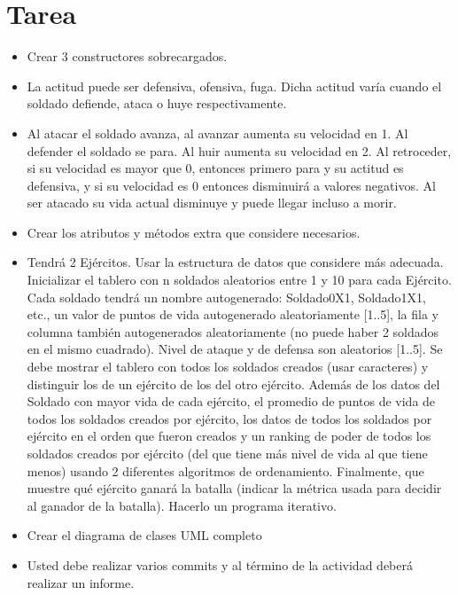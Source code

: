 \documentclass{article}
\begin{document}
	\section{Tarea}
	\begin{itemize}
		\item	 Crear 3 constructores sobrecargados.
		\item La actitud puede ser defensiva, ofensiva, fuga. Dicha actitud varía cuando el 
		soldado defiende, ataca o huye respectivamente.
		\item	Al atacar el soldado avanza, al avanzar aumenta su velocidad en 1. Al defender 
		el soldado se para. Al huir aumenta su velocidad en 2. Al retroceder, si su 
		velocidad es mayor que 0, entonces primero para y su actitud es defensiva, y 
		si su velocidad es 0 entonces disminuirá a valores negativos. Al ser atacado su 
		vida actual disminuye y puede llegar incluso a morir.
		\item Crear los atributos y métodos extra que considere necesarios.
		\item Tendrá 2 Ejércitos. Usar la estructura de datos que considere más adecuada. 
		Inicializar el tablero con n soldados aleatorios entre 1 y 10 para cada Ejército. 
		Cada soldado tendrá un nombre autogenerado: Soldado0X1, Soldado1X1, etc.,
		un valor de puntos de vida autogenerado aleatoriamente [1..5], la fila y 
		columna también autogenerados aleatoriamente (no puede haber 2 soldados 
		en el mismo cuadrado). Nivel de ataque y de defensa son aleatorios [1..5]. Se 
		debe mostrar el tablero con todos los soldados creados (usar caracteres) y distinguir los de un ejército de los del otro ejército. Además de 
		los datos del Soldado con mayor vida de cada ejército, el promedio de puntos 
		de vida de todos los soldados creados por ejército, los datos de todos los 
		soldados por ejército en el orden que fueron creados y un ranking de poder de 
		todos los soldados creados por ejército (del que tiene más nivel de vida al que 
		tiene menos) usando 2 diferentes algoritmos de ordenamiento. Finalmente, que 
		muestre qué ejército ganará la batalla (indicar la métrica usada para decidir al 
		ganador de la batalla). Hacerlo un programa iterativo.
		\item  Crear el diagrama de clases UML completo
	
		\item Usted debe realizar varios commits y al término de la actividad deberá realizar un informe.
		
		
	\end{itemize}
	
\end{document}
